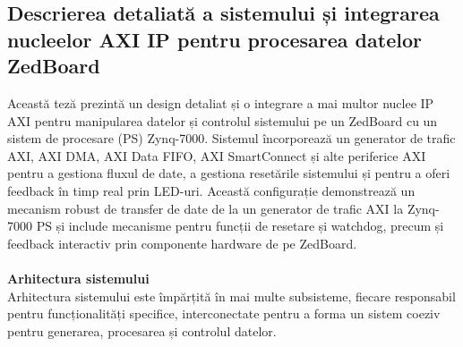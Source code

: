 \documentclass[12pt]{article}
\begin{document}
\subsection{Descrierea detaliată a sistemului și integrarea nucleelor AXI IP pentru procesarea datelor ZedBoard}
\hspace*{1cm}Această teză prezintă un design detaliat și o integrare a mai multor nuclee IP AXI pentru manipularea datelor și controlul sistemului pe un ZedBoard cu un sistem de procesare (PS) Zynq-7000. Sistemul încorporează un generator de trafic AXI, AXI DMA, AXI Data FIFO, AXI SmartConnect și alte periferice AXI pentru a gestiona fluxul de date, a gestiona resetările sistemului și pentru a oferi feedback în timp real prin LED-uri. Această configurație demonstrează un mecanism robust de transfer de date de la un generator de trafic AXI la Zynq-7000 PS și include mecanisme pentru funcții de resetare și watchdog, precum și feedback interactiv prin componente hardware de pe ZedBoard.\\\\
\hspace*{1cm}\textbf{Arhitectura sistemului}\\
\hspace*{1cm}Arhitectura sistemului este împărțită în mai multe subsisteme, fiecare responsabil pentru funcționalități specifice, interconectate pentru a forma un sistem coeziv pentru generarea, procesarea și controlul datelor.
\end{document}
